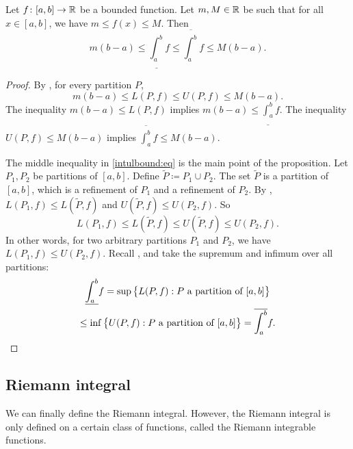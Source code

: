 \begin{prop} \label{intulbound:prop}
Let $f \colon [a,b] \to {\mathbb{R}}$ be a bounded function.  Let $m, M \in {\mathbb{R}}$ be 
such that for all $x \in [a,b]$, we have $m \leq f(x) \leq M$.  Then
\begin{equation}
\label{intulbound:eq}
m(b-a) \leq
\underline{\int_a^b} f \leq \overline{\int_a^b} f
\leq M(b-a) .
\end{equation}
\end{prop}

\begin{proof}
By , for every partition $P$,
\begin{equation*}
m(b-a) \leq L(P,f) \leq U(P,f) \leq M(b-a).
\end{equation*}
The inequality
$m(b-a) \leq L(P,f)$ implies $m(b-a) \leq \underline{\int_a^b} f$.
The inequality
$U(P,f) \leq M(b-a)$ implies $\overline{\int_a^b} f \leq M(b-a)$.

The middle inequality in
\eqref{intulbound:eq} is the main point of the proposition.
Let $P_1, P_2$ be partitions of $[a,b]$.  Define 
$\widetilde{P} \coloneqq P_1 \cup P_2$.
The set $\widetilde{P}$ is a partition of $[a,b]$, which
is a refinement of $P_1$ and a refinement of $P_2$.
By ,
$L(P_1,f) \leq L(\widetilde{P},f)$ and
$U(\widetilde{P},f) \leq U(P_2,f)$.  So
\begin{equation*}
L(P_1,f) \leq L(\widetilde{P},f) \leq U(\widetilde{P},f) \leq U(P_2,f) .
\end{equation*}
In other words, for two arbitrary partitions $P_1$ and $P_2$, we have
$L(P_1,f) \leq U(P_2,f)$.  
Recall , and take the supremum and
infimum over all partitions:
\begin{multline*}
\underline{\int_a^b} f = 
\sup \, \bigl\{ L(P,f) : P \text{ a partition of } [a,b] \bigr\}
\\
\leq
\inf \, \bigl\{ U(P,f) : P \text{ a partition of } [a,b] \bigr\}
=
\overline{\int_a^b} f . \qedhere
\end{multline*}
\end{proof}

\subsection{Riemann integral}

We can finally define the Riemann integral.  However, the Riemann
integral is only defined on a certain class of functions, called the
Riemann integrable functions.

